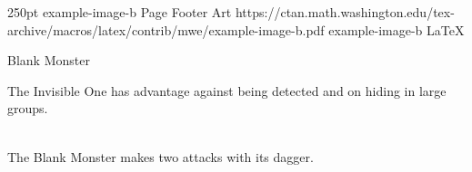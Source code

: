 \MonsterFooterGraphic{175pt}%
	{250pt}%
	{example-image-b}%
	{}%
	{Page \thepage}%
	{Footer Art}%
	{https://ctan.math.washington.edu/tex-archive/macros/latex/contrib/mwe/example-image-b.pdf}%
	{example-image-b}%
	{LaTeX}%

\vspace*{-1.3cm}\begin{DndMonster}[width=0.5\textwidth]{Blank Monster}

    \DndMonsterBasics[
        armor-class = {10},
        hit-points  = {\DndDice{1d12 + 6}},
        speed       = {30 ft., climb 25 ft.},
    ]

    \DndMonsterAbilityScores[
    ]

    \DndMonsterDetails[
        challenge = 1,
    ]
    
    The Invisible One has advantage against being detected and on hiding in large groups.\\\\
    \lipsum[1-2]
	
	The Blank Monster makes two attacks with its dagger.
	
	\DndMonsterAttack[
      name=Dagger,
      distance=melee, %
      mod=+3,
      reach=10,
      targets=one target,
      dmg=\DndDice{1d8 + 2},
      dmg-type=slashing,
    ]
      
\end{DndMonster}

\vfill\eject %


\lipsum[1-3]